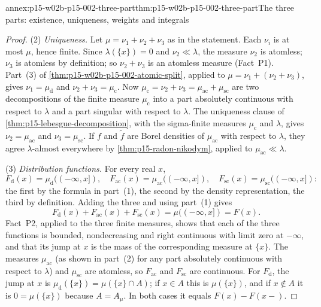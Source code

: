 \begin{annexitem}{annex:p15-w02b-p15-002-three-part}{thm:p15-w02b-p15-002-three-part}{The three parts: existence, uniqueness, weights and integrals}
\begin{proof}
(2) \emph{Uniqueness.} Let \(\mu=\nu_1+\nu_2+\nu_3\) as in the
statement. Each \(\nu_i\) is at most \(\mu\), hence finite. Since
\(\lambda(\{x\})=0\) and \(\nu_2\ll\lambda\), the measure \(\nu_2\) is
atomless; \(\nu_3\) is atomless by definition; so \(\nu_2+\nu_3\) is an
atomless measure (Fact~P1). Part~(3) of
\cref{thm:p15-w02b-p15-002-atomic-split}, applied to
\(\mu=\nu_1+(\nu_2+\nu_3)\), gives \(\nu_1=\mu_{\mathrm d}\) and
\(\nu_2+\nu_3=\mu_{\mathrm c}\). Now
\(\mu_{\mathrm c}=\nu_2+\nu_3=\mu_{\mathrm{ac}}+\mu_{\mathrm{sc}}\) are
two decompositions of the finite measure \(\mu_{\mathrm c}\) into a part
absolutely continuous with respect to \(\lambda\) and a part singular
with respect to \(\lambda\). The uniqueness clause of
\cref{thm:p15-lebesgue-decomposition}, with the sigma-finite measures
\(\mu_{\mathrm c}\) and \(\lambda\), gives \(\nu_2=\mu_{\mathrm{ac}}\)
and \(\nu_3=\mu_{\mathrm{sc}}\). If \(f\) and \(\tilde f\) are Borel
densities of \(\mu_{\mathrm{ac}}\) with respect to \(\lambda\), they
agree \(\lambda\)-almost everywhere by \cref{thm:p15-radon-nikodym},
applied to \(\mu_{\mathrm{ac}}\ll\lambda\).

(3) \emph{Distribution functions.} For every real \(x\),
\[
 F_{\mathrm d}(x)=\mu_{\mathrm d}((-\infty,x]),\quad
 F_{\mathrm{ac}}(x)=\mu_{\mathrm{ac}}((-\infty,x]),\quad
 F_{\mathrm{sc}}(x)=\mu_{\mathrm{sc}}((-\infty,x]):
\]
the first by the formula in part~(1), the second by the density
representation, the third by definition. Adding the three and using
part~(1) gives
\[
 F_{\mathrm d}(x)+F_{\mathrm{ac}}(x)+F_{\mathrm{sc}}(x)
   =\mu((-\infty,x])=F(x).
\]
Fact~P2, applied to the three finite measures, shows that each of the
three functions is bounded, nondecreasing and right continuous with
limit zero at \(-\infty\), and that its jump at \(x\) is the mass of the
corresponding measure at \(\{x\}\). The measures \(\mu_{\mathrm{ac}}\)
(as shown in part~(2) for any part absolutely continuous with respect to
\(\lambda\)) and \(\mu_{\mathrm{sc}}\) are atomless, so
\(F_{\mathrm{ac}}\) and \(F_{\mathrm{sc}}\) are continuous. For
\(F_{\mathrm d}\), the jump at \(x\) is
\(\mu_{\mathrm d}(\{x\})=\mu(\{x\}\cap A)\); if \(x\in A\) this is
\(\mu(\{x\})\), and if \(x\notin A\) it is \(0=\mu(\{x\})\) because
\(A=A_\mu\). In both cases it equals \(F(x)-F(x-)\).


\end{proof}
\end{annexitem}
